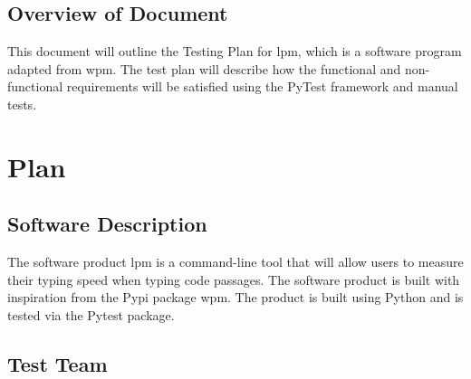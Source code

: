 \documentclass[12pt, titlepage]{article}
\begin{document}





\subsection{Overview of Document}

This document will outline the Testing Plan for lpm, which is a software program adapted from wpm. The test plan will describe how the functional and non-functional requirements will be satisfied using the PyTest framework and manual tests.

\section{Plan}

\subsection{Software Description}

The software product lpm is a command-line tool that will allow users to measure their typing speed when typing code passages. The software product is built with inspiration from the Pypi package wpm. The product is built using Python and is tested via the Pytest package.

\subsection{Test Team}
\end{document}
